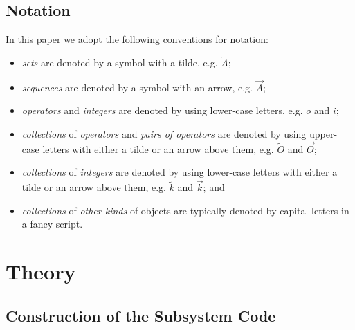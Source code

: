 \documentclass[12pt]{amsbook}
\theoremstyle{plain}
\theoremstyle{definition}
\theoremstyle{remark}
\begin{document}
\section{Notation}

In this paper we adopt the following conventions for notation:

\begin{itemize}
\item \emph{sets} are denoted by a symbol with a tilde, e.g. $\tilde A$;
\item \emph{sequences} are denoted by a symbol with an arrow, e.g. $\vec A$;
\item \emph{operators} and \emph{integers} are denoted by using lower-case letters, e.g. $o$ and $i$;
\item \emph{collections} of \emph{operators} and \emph{pairs of operators} are denoted by using upper-case letters with either a tilde or an arrow above them, e.g. $\tilde O$ and $\vec O$;
\item \emph{collections} of \emph{integers} are denoted by using lower-case letters with either a tilde or an arrow above them, e.g. $\tilde k$ and $\vec k$;  and
\item \emph{collections} of \emph{other kinds} of objects are typically denoted by capital letters in a fancy script.
\end{itemize}
\chapter{Theory} \label{sec:algorithm}
\section{Construction of the Subsystem Code}
\end{document}
